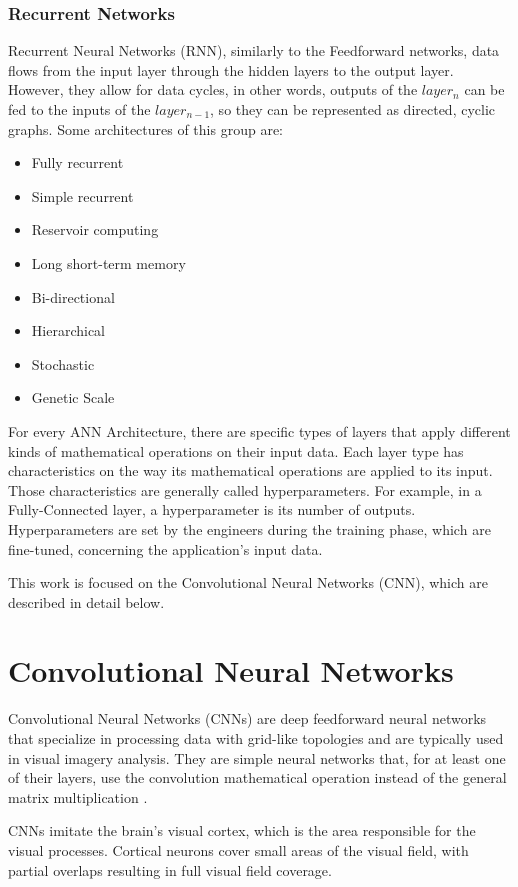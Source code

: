 \subsubsection{Recurrent Networks}
Recurrent Neural Networks (RNN), similarly to the Feedforward networks, data flows from the input layer through the hidden layers to the output layer. However, they allow for data cycles, in other words, outputs of the $layer_n$ can be fed to the inputs of the $layer_{n-1}$, so they can be represented as directed, cyclic graphs. Some architectures of this group are:
\begin{itemize}
	\item Fully recurrent
	\item Simple recurrent
	\item Reservoir computing
	\item Long short-term memory
	\item Bi-directional
	\item Hierarchical
	\item Stochastic
	\item Genetic Scale
\end{itemize}
For every ANN Architecture, there are specific types of layers that apply different kinds of mathematical operations on their input data. Each layer type has characteristics on the way its mathematical operations are applied to its input. Those characteristics are generally called hyperparameters. For example, in a Fully-Connected layer, a hyperparameter is its number of outputs. Hyperparameters are set by the engineers during the training phase, which are fine-tuned, concerning the application's input data.

This work is focused on the Convolutional Neural Networks (CNN), which are described in detail below.

\section{Convolutional Neural Networks}
Convolutional Neural Networks (CNNs) are deep feedforward neural networks that specialize in processing data with grid-like topologies and are typically used in visual imagery analysis. They are simple neural networks that, for at least one of their layers, use the convolution mathematical operation instead of the general matrix multiplication \cite{Goodfellow-et-al-2016}.

CNNs imitate the brain's visual cortex, which is the area responsible for the visual processes. Cortical neurons cover small areas of the visual field, with partial overlaps resulting in full visual field coverage.

